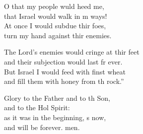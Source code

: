 \begin{psalmverse}
\begin{patverse}
O that my people wuld heed me,\Med\\
that Israel would walk in m ways!\\
At once I would subdue thir foes,\Med\\
turn my hand against thir enemies.

The Lord’s enemies would cringe at thir feet\Med\\
and their subjection would last fr ever.\\
But Israel I would feed with finst wheat\Med\\
and fill them with honey from th rock.”

Glory to the Father and to th Son,\Med\\
and to the Hol Spirit:\\
as it was in the beginning, s now,\Med\\
and will be forever. men. 
  \end{patverse}
\end{psalmverse}

